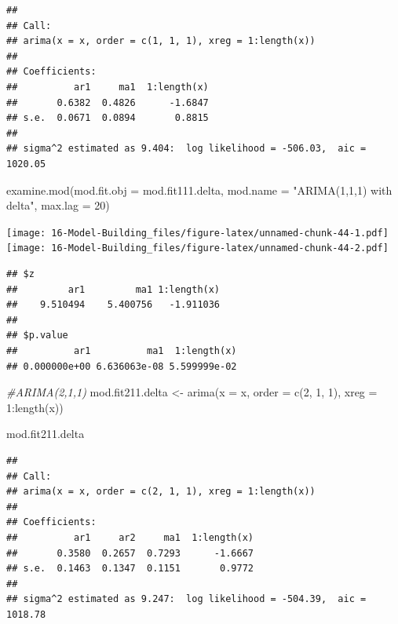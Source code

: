 \documentclass[
]{book}
\newenvironment{Shaded}{\begin{snugshade}}{\end{snugshade}}
\newcommand{\AttributeTok}[1]{\textcolor[rgb]{0.77,0.63,0.00}{#1}}
\newcommand{\CommentTok}[1]{\textcolor[rgb]{0.56,0.35,0.01}{\textit{#1}}}
\newcommand{\DecValTok}[1]{\textcolor[rgb]{0.00,0.00,0.81}{#1}}
\newcommand{\FunctionTok}[1]{\textcolor[rgb]{0.00,0.00,0.00}{#1}}
\newcommand{\NormalTok}[1]{#1}
\newcommand{\OtherTok}[1]{\textcolor[rgb]{0.56,0.35,0.01}{#1}}
\newcommand{\SpecialCharTok}[1]{\textcolor[rgb]{0.00,0.00,0.00}{#1}}
\newcommand{\StringTok}[1]{\textcolor[rgb]{0.31,0.60,0.02}{#1}}
\theoremstyle{definition}
\theoremstyle{definition}
\theoremstyle{definition}
\theoremstyle{definition}
\theoremstyle{remark}
\begin{document}
\begin{verbatim}
## 
## Call:
## arima(x = x, order = c(1, 1, 1), xreg = 1:length(x))
## 
## Coefficients:
##          ar1     ma1  1:length(x)
##       0.6382  0.4826      -1.6847
## s.e.  0.0671  0.0894       0.8815
## 
## sigma^2 estimated as 9.404:  log likelihood = -506.03,  aic = 1020.05
\end{verbatim}

\begin{Shaded}
\begin{Highlighting}[]
\FunctionTok{examine.mod}\NormalTok{(}\AttributeTok{mod.fit.obj =}\NormalTok{ mod.fit111.delta, }\AttributeTok{mod.name =} \StringTok{"ARIMA(1,1,1) with delta"}\NormalTok{, }\AttributeTok{max.lag =} \DecValTok{20}\NormalTok{)}
\end{Highlighting}
\end{Shaded}

\texttt{[image: 16-Model-Building\_files/figure-latex/unnamed-chunk-44-1.pdf]} \texttt{[image: 16-Model-Building\_files/figure-latex/unnamed-chunk-44-2.pdf]}

\begin{verbatim}
## $z
##         ar1         ma1 1:length(x) 
##    9.510494    5.400756   -1.911036 
## 
## $p.value
##          ar1          ma1  1:length(x) 
## 0.000000e+00 6.636063e-08 5.599999e-02
\end{verbatim}

\begin{Shaded}
\begin{Highlighting}[]
\CommentTok{\#ARIMA(2,1,1)}
\NormalTok{mod.fit211.delta }\OtherTok{\textless{}{-}} \FunctionTok{arima}\NormalTok{(}\AttributeTok{x =}\NormalTok{ x, }\AttributeTok{order =} \FunctionTok{c}\NormalTok{(}\DecValTok{2}\NormalTok{, }\DecValTok{1}\NormalTok{, }\DecValTok{1}\NormalTok{), }\AttributeTok{xreg =} \DecValTok{1}\SpecialCharTok{:}\FunctionTok{length}\NormalTok{(x))}
  
\NormalTok{mod.fit211.delta}
\end{Highlighting}
\end{Shaded}

\begin{verbatim}
## 
## Call:
## arima(x = x, order = c(2, 1, 1), xreg = 1:length(x))
## 
## Coefficients:
##          ar1     ar2     ma1  1:length(x)
##       0.3580  0.2657  0.7293      -1.6667
## s.e.  0.1463  0.1347  0.1151       0.9772
## 
## sigma^2 estimated as 9.247:  log likelihood = -504.39,  aic = 1018.78
\end{verbatim}
\end{document}
